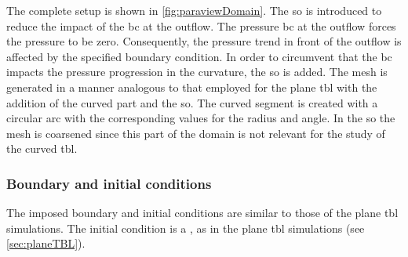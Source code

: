 The complete setup is shown in \autoref{fig:paraviewDomain}.
The \acrlong{so} is introduced to reduce the impact of the \acrlong{bc} at the outflow. 
The pressure \acrshort{bc} at the outflow forces the pressure to be zero.
Consequently, the pressure trend in front of the outflow is affected by the specified boundary condition.
In order to circumvent  that the \acrshort{bc} impacts the pressure progression in the curvature, the \acrlong{so} is added.
The mesh is generated in a manner analogous to that employed for the plane  \acrshort{tbl} with the addition of the curved part and the \acrlong{so}.
The curved segment is created with a circular arc with the corresponding values for the radius and angle.
In the \acrlong{so} the mesh is coarsened since this part of the domain is not relevant for the study of the curved \acrshort{tbl}. \\

\subsubsection{Boundary and initial conditions}
The imposed boundary and initial conditions are similar to those of the plane \acrshort{tbl} simulations.
The initial condition is a , as in the plane \acrshort{tbl} simulations (see \autoref{sec:planeTBL}).


